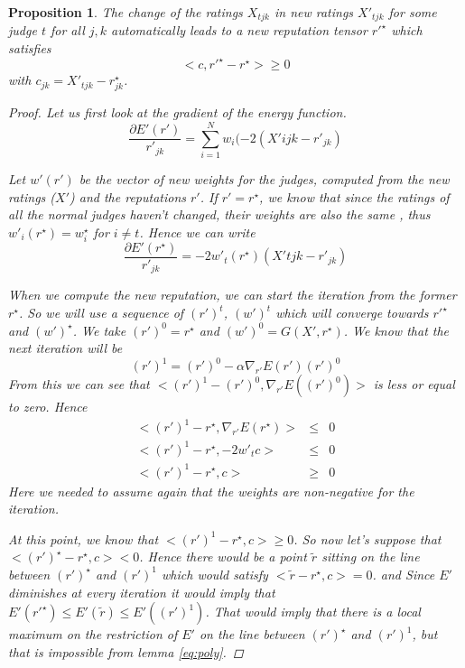\documentclass[12pt,a4paper]{article}
\newtheorem{proposition}{Proposition}
\begin{document}
\begin{proposition}
The change of the ratings $X_{tjk}$ in new ratings $X'_{tjk}$ for some judge $t$ for all $j,k$ automatically leads to a new reputation tensor $r'^{\star}$ which satisfies 
$$ <c, r'^{\star} - r^{\star}> \geq 0$$
with $c_{jk} = X'_{tjk} - r^{\star}_{jk}$.
\label{pr:hyperp}
\begin{proof}
Let us first look at the gradient of the energy function.
$$\frac{\partial E'(r')}{r'_{jk}} = \sum_{i=1}^N w_i (-2 (X'{ijk}-r'_{jk})$$

Let $w'(r')$ be the vector of new weights for the judges, computed from the new ratings ($X'$) and the reputations $r'$.
If $r' = r^{\star}$, we know that since the ratings of all the normal judges haven't changed, their weights are also the same , thus $w'_i(r^{\star}) = w_i^{\star}$ for $i \neq t$. Hence we can write
$$ \frac{\partial E'(r^{\star})}{r'_{jk}} = -2 w'_t(r^{\star}) (X'{tjk}-r'_{jk})$$

When we compute the new reputation, we can start the iteration from the former $r^{\star}$. So we will use a sequence of $(r')^t$, $(w')^t$ which will converge towards $r'^{\star}$ and $(w')^{\star}$.
We take $(r')^0 = r^{\star}$ and $(w')^0 = G(X',r^{\star})$. We know that the next iteration will be 
$$ (r')^1 = (r')^0 - \alpha \nabla_{r'}E(r'){(r')^0}$$
From this we can see that $<(r')^1 - (r')^0, \nabla_{r'}E((r')^0)>$ is less or equal to zero.
Hence 
\begin{eqnarray*}
<(r')^1 - r^{\star}, \nabla_{r'}E(r^{\star})> & \leq & 0\\
<(r')^1 - r^{\star}, -2 w'_t c> & \leq & 0\\
<(r')^1 - r^{\star}, c> & \geq & 0
\end{eqnarray*}
Here we needed to assume again that the weights are non-negative for the iteration.

At this point, we know that $<(r')^1 - r^{\star}, c>  \geq  0$.
So now let's suppose that $<(r')^{\star} - r^{\star}, c>  <  0$. Hence there would be a point $\tilde{r}$ sitting on the line between $(r')^{\star}$ and $(r')^1$ which would satisfy $<\tilde{r}- r^{\star}, c> = 0 $. and Since $E'$ diminishes at every iteration it would imply that $E'(r'^{\star}) \leq E'(\tilde{r}) \leq E'((r')^1)$. That would imply that there is a local maximum on the restriction of $E'$ on the line between $(r')^{\star}$ and $(r')^1$, but that is impossible from lemma \ref{eq:poly}.
\end{proof}

\end{proposition}
\end{document}
